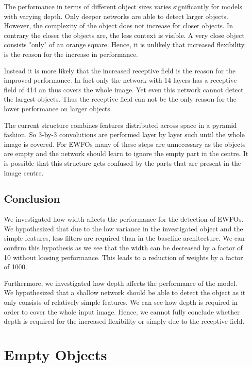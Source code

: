 	The performance in terms of different object sizes varies significantly for models with varying depth. Only deeper networks are able to detect larger objects. However, the complexity of the object does not increase for closer objects. In contrary the closer the objects are, the less context is visible. A very close object consists "only" of an orange square. Hence, it is unlikely that increased flexibility is the reason for the increase in performance. 
	
	Instead it is more likely that the increased receptive field is the reason for the improved performance. In fact only the network with 14 layers has a receptive field of 414 an thus covers the whole image. Yet even this network cannot detect the largest objects. Thus the receptive field can not be the only reason for the lower performance on larger objects.
	
	 The current structure combines features distributed across space in a pyramid fashion. So 3-by-3 convolutions are performed layer by layer such until the whole image is covered. For \acp{EWFO} many of these steps are unnecessary as the objects are empty and the network should learn to ignore the empty part in the centre. It is possible that this structure gets confused by the parts that are present in the image centre.
	
	\subsection{Conclusion}
	
	We investigated how width affects the performance for the detection of \acp{EWFO}. We hypothesized that due to the low variance in the investigated object and the simple features, less filters are required than in the baseline architecture. We can confirm this hypothesis as we see that the width can be decreased by a factor of 10 without loosing performance. This leads to a reduction of weights by a factor of 1000. 
	
	Furthermore, we investigated how depth affects the performance of the model. We hypothesized that a shallow network should be able to detect the object as it only consists of relatively simple features. We can see how depth is required in order to cover the whole input image. Hence, we cannot fully conclude whether depth is required for the increased flexibility or simply due to the receptive field. 
	
	\section{Empty Objects}
	
